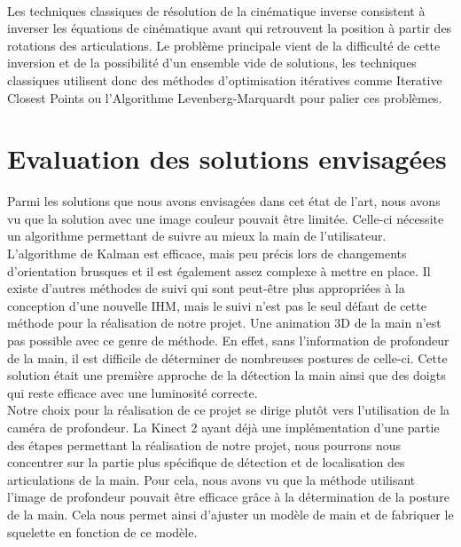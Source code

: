 \paragraph{}
Les techniques classiques de résolution de la cinématique inverse consistent à inverser les équations de cinématique avant qui retrouvent la position à partir des rotations des articulations.
Le problème principale vient de la difficulté de cette inversion et de la possibilité d'un ensemble vide de solutions, les techniques classiques utilisent donc des méthodes d'optimisation itératives comme Iterative Closest Points ou l'Algorithme Levenberg-Marquardt pour palier ces problèmes.

\section{Evaluation des solutions envisagées}
Parmi les solutions que nous avons envisagées dans cet état de l'art, nous avons vu que la solution avec une
image couleur pouvait être limitée. Celle-ci nécessite un algorithme permettant de suivre au mieux
la main de l'utilisateur. L'algorithme de Kalman est efficace, mais peu précis lors de changements d'orientation
brusques et il est également assez complexe à mettre en place. Il existe d'autres méthodes de suivi qui sont
peut-être plus appropriées à la conception d'une nouvelle IHM, mais le suivi n'est pas le seul défaut de cette
méthode pour la réalisation de notre projet. Une animation 3D de la main n'est pas possible avec ce genre de méthode. 
En effet, sans l'information de profondeur de la main, il est difficile de déterminer de nombreuses postures de celle-ci. 
Cette solution était une première approche de la détection la main ainsi que des doigts qui reste efficace avec une luminosité correcte.\\

Notre choix pour la réalisation de ce projet se dirige plutôt vers l'utilisation de la caméra de profondeur.
La Kinect 2 ayant déjà une implémentation d'une partie des étapes permettant la réalisation de notre projet, nous pourrons
nous concentrer sur la partie plus spécifique de détection et de localisation des articulations de la main.
Pour cela, nous avons vu que la méthode utilisant l'image de profondeur pouvait être efficace grâce à la
détermination de la posture de la main. Cela nous permet ainsi d'ajuster un modèle de main et de fabriquer
le squelette en fonction de ce modèle.\\
